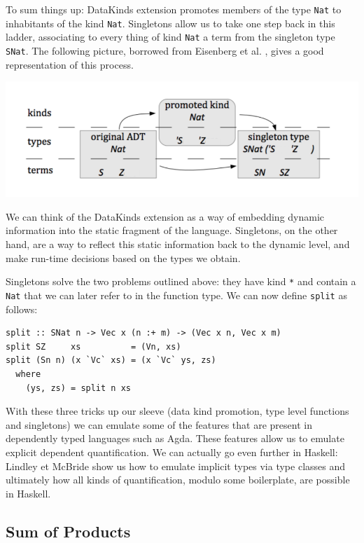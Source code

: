 \documentclass[11pt, titlepage]{article}
\begin{document}
To sum things up:
DataKinds extension promotes members of the type \texttt{Nat} to inhabitants of the kind \texttt{Nat}. Singletons allow us to take one step back in this ladder, associating to every thing of kind \texttt{Nat} a term from
the singleton type \texttt{SNat}. The following picture, borrowed from Eisenberg et al. \cite{singletons}, gives a good representation of this process.

\includegraphics[width=\textwidth]{singleton.png}\label{singletonImg}

We can think of the DataKinds extension as a way of embedding dynamic information into the static fragment of the language. Singletons, on the other hand, are a way to reflect this static information back to the dynamic level, and make run-time decisions based on the types we obtain.

Singletons solve the two problems outlined above: they have kind \texttt{*} and contain a \texttt{Nat} that we can later refer to in the function type. We can now define \texttt{split} as follows:

\begin{verbatim}
split :: SNat n -> Vec x (n :+ m) -> (Vec x n, Vec x m)
split SZ     xs          = (Vn, xs)
split (Sn n) (x `Vc` xs) = (x `Vc` ys, zs)
  where
    (ys, zs) = split n xs
\end{verbatim}

With these three tricks up our sleeve (data kind promotion, type level functions and singletons) we can emulate some of the features that are present in dependently typed languages such as Agda. These features allow us to emulate explicit dependent quantification. We can actually go even further in Haskell: Lindley et McBride \cite{hasochism} show us how to emulate implicit types via type classes and ultimately how all kinds of quantification, modulo some boilerplate, are possible in Haskell.

\subsection{Sum of Products}\label{SOP}
\end{document}
